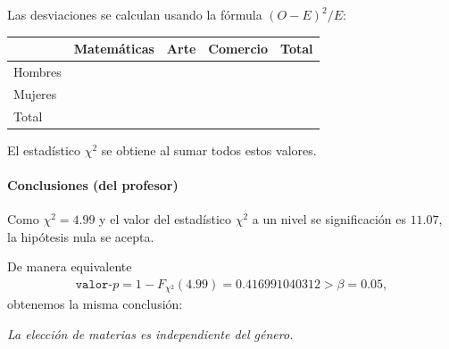 Las desviaciones se calculan usando la fórmula
$(O-E)^2/E$:
\begin{center}
\begin{tabular}{|l|l|l|l|l|}\hline
 & Matemáticas & Arte & Comercio & Total\\\hline
Hombres &  &  &  & \\\hline
Mujeres &  &  &  & \\\hline
Total &  &  &  & \\\hline
\end{tabular}
\end{center}

El estadístico $\chi^{2}$ se obtiene al sumar todos estos valores.

\paragraph{Conclusiones (del profesor)}
Como $\chi^{2}= 4.99$ y el valor del estadístico $\chi^{2}$ a un nivel se significación es $11.07,$ la hipótesis nula se acepta.

De manera equivalente
\begin{align}
 \texttt{valor-}p=1- F_{\chi^{2}}(4.99)=0.416991040312>\beta=0.05,
\end{align}
 obtenemos la misma conclusión:
 \begin{center}
  \emph{La elección de materias es independiente del género.}
 \end{center}


